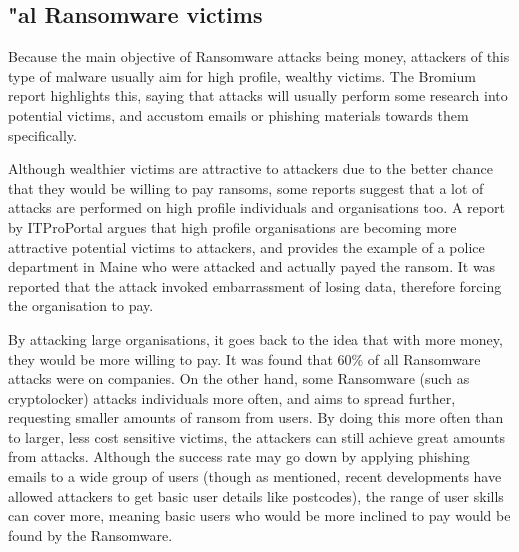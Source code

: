 \documentclass[journal,comsoc]{IEEEtran}
\begin{document}
\subsection{"al Ransomware victims}
Because the main objective of Ransomware attacks being money, attackers of this type of malware usually aim for high profile, wealthy victims. The Bromium report highlights this, saying that attacks will usually perform some research into potential victims, and accustom emails or phishing materials towards them specifically. \par
Although wealthier victims are attractive to attackers due to the better chance that they would be willing to pay ransoms, some reports suggest that a lot of attacks are performed on high profile individuals and organisations too. A report by ITProPortal \cite{pro-portal} argues that high profile organisations are becoming more attractive potential victims to attackers, and provides the example of a police department in Maine who were attacked and actually payed the ransom. It was reported that the attack invoked embarrassment of losing data, therefore forcing the organisation to pay. \par
By attacking large organisations, it goes back to the idea that with more money, they would be more willing to pay. It was found that 60\% of all Ransomware attacks were on companies. On the other hand, some Ransomware (such as cryptolocker) attacks individuals more often, and aims to spread further, requesting smaller amounts of ransom from users. By doing this more often than to larger, less cost sensitive victims, the attackers can still achieve great amounts from attacks. Although the success rate may go down by applying phishing emails to a wide group of users (though as mentioned, recent developments have allowed attackers to get basic user details like postcodes), the range of user skills can cover more, meaning basic users who would be more inclined to pay would be found by the Ransomware.
\end{document}
